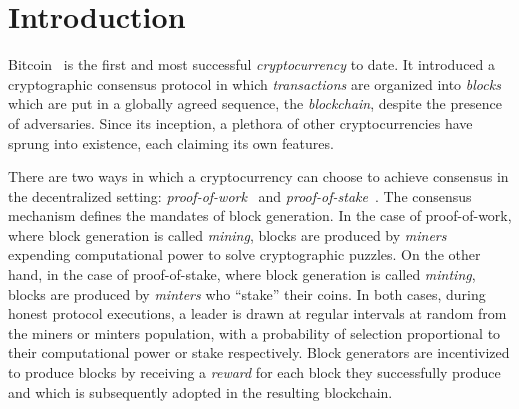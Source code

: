 
\section{Introduction}

Bitcoin~\cite{bitcoin} is the first and most successful \emph{cryptocurrency} to
date. It introduced a cryptographic consensus protocol in
which \emph{transactions} are organized into \emph{blocks} which are put in a
globally agreed sequence, the \emph{blockchain}, despite the presence of adversaries. Since its
inception, a plethora of other cryptocurrencies have sprung into existence, each
claiming its own features.

There are two ways in which a cryptocurrency can choose to achieve consensus in
the decentralized setting:
\emph{proof-of-work}~\cite{C:DwoNao92} and
\emph{proof-of-stake}~\cite{C:KRDO17}. The consensus mechanism defines the
mandates of block generation. In the case of proof-of-work, where block
generation is called \emph{mining}, blocks are produced by \emph{miners}
expending computational power to solve cryptographic puzzles. On the other hand,
in the case of proof-of-stake, where block generation is called \emph{minting},
blocks are produced by \emph{minters} who ``stake'' their coins. In both cases,
during honest protocol executions, a leader is drawn at regular intervals at random from the
miners or minters population, with a probability of selection proportional to
their computational power or stake respectively. Block generators are
incentivized to produce blocks by receiving a \emph{reward} for each block they
successfully produce and which is subsequently adopted in the resulting
blockchain.

